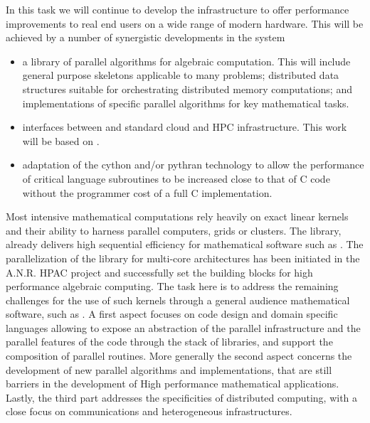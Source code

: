 \begin{workpackage}
\begin{tasklist}
\begin{task}[title=GAP,id=hpc-gap, lead=SA]
In this task we will continue to develop the \GAP infrastructure to
offer performance improvements to real end users on a wide range of
modern hardware. This will be achieved by a number of synergistic
developments in the system

\begin{itemize}
\item a library of parallel algorithms for algebraic computation. This
  will include general purpose skeletons applicable to many problems;
  distributed data structures suitable for orchestrating distributed
  memory computations; and implementations of specific parallel algorithms for key
  mathematical tasks.  
\item interfaces between \GAP and standard cloud and HPC
  infrastructure. This work will be based on .
\item adaptation of the cython and/or pythran technology to allow the
  performance of critical \GAP language subroutines to be increased
  close to that of C code without the programmer cost of a full C implementation.
\end{itemize}
\end{task}

\begin{task}[title=Linbox,id=hpc-linbox, lead=UJF]
Most intensive mathematical computations rely heavily on exact linear kernels
and their ability to harness parallel computers, grids or clusters. The \Linbox
library, already delivers high sequential efficiency for mathematical software
such as \Sage. The parallelization of the library for multi-core architectures
has been initiated in the A.N.R. HPAC project and successfully set the building
blocks for high performance algebraic computing. 
The task here is to  address the remaining challenges for the use of such
kernels through a general audience mathematical software, such as \Sage.
A first aspect focuses on code design and domain specific languages allowing to
expose an abstraction of the parallel infrastructure and the parallel features
of the code through the stack of libraries, and support the
composition of parallel routines.  More generally the second aspect concerns the
development of new parallel algorithms and implementations, that are still
barriers in the development of High performance mathematical
applications. Lastly, the third part addresses the specificities of  distributed
computing, with a close focus on communications and heterogeneous infrastructures.


\end{task}
\end{tasklist}
\end{workpackage}

